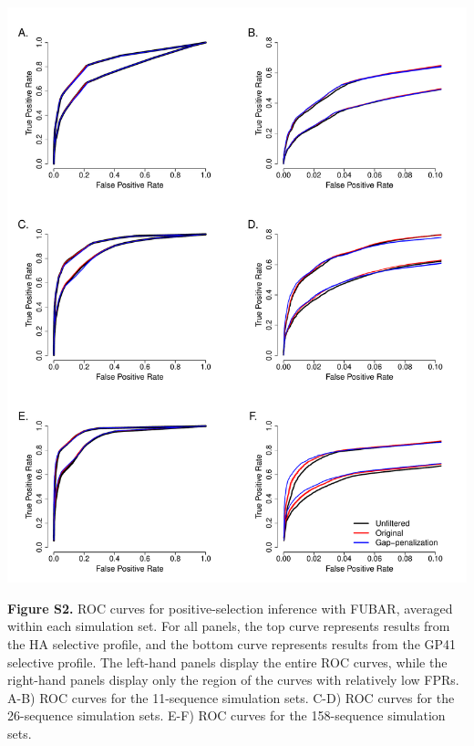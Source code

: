 \documentclass[11pt]{article}
\begin{document}
\newpage
\centerline{\includegraphics[width=6.25in]{Figures/ROC_SI_fubar.pdf}}
\noindent \textbf{Figure S2.} ROC curves for positive-selection inference with FUBAR, averaged within each simulation set. For all panels, the top curve represents results from the HA selective profile, and the bottom curve represents results from the GP41 selective profile. The left-hand panels display the entire ROC curves, while the right-hand panels display only the region of the curves with relatively low FPRs.  A-B) ROC curves for the 11-sequence simulation sets. C-D) ROC curves for the 26-sequence simulation sets. E-F) ROC curves for the 158-sequence simulation sets.

\newpage


	
\end{document}
